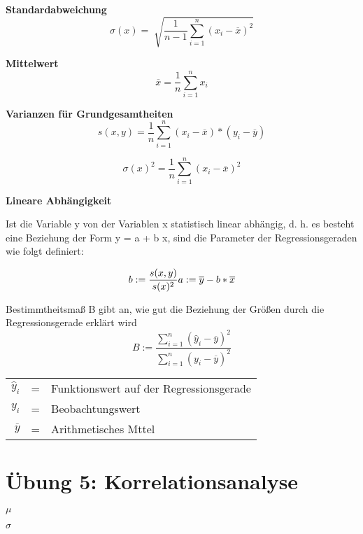 \documentclass[11pt,twocolumn,fleqn]{article}
\begin{document}
\textbf{Standardabweichung}
\begin{equation*}
\sigma(x) = \sqrt[]{ \frac{1}{n-1}\sum^n_{i=1}(x_i-\overline{x})^2 }
\end{equation*}

\textbf{Mittelwert}
\begin{equation*}
\overline{x}=\frac{1}{n}\sum^n_{i=1}x_i
\end{equation*}

\textbf{Varianzen für Grundgesamtheiten}
\begin{equation*}
s(x,y)=\frac{1}{n}\sum^n_{i=1}(x_i-\overline{x})*(y_i-\overline{y}) 
\end{equation*}

\begin{equation*}
\sigma(x)^2=\frac{1}{n}\sum^n_{i=1}(x_i-\overline{x})^2 
\end{equation*}

\textbf{Lineare Abhängigkeit}

Ist die Variable y von der Variablen x statistisch linear abhängig, d. h. es besteht eine Beziehung der Form y = a + b x, sind die Parameter der Regressionsgeraden wie folgt definiert: 

\begin{equation*}
b:=\frac{s(x,y)}{s(x)^2}\\
a:=\overline{y}-b*\overline{x}
\end{equation*}

Bestimmtheitsmaß B gibt an, wie gut die Beziehung der Größen durch die Regressionsgerade erklärt wird
\begin{equation*}
B:=\frac{ \sum^n_{i=1}(\widehat{y}_i-\overline{y})^2 }{ \sum^n_{i=1}(y_i-\overline{y})^2 }
\end{equation*}
\begin{center}\begin{tabular}{rcl}
   $\widehat{y}_i$ & = & Funktionswert auf der Regressionsgerade \\
   $y_i$ & = & Beobachtungswert \\
   $\overline{y}$ & = & Arithmetisches Mttel \\
\end{tabular}\end{center}

\section{Übung 5: Korrelationsanalyse}
\textbf{$\mu$}


\textbf{$\sigma$}
\end{document}
